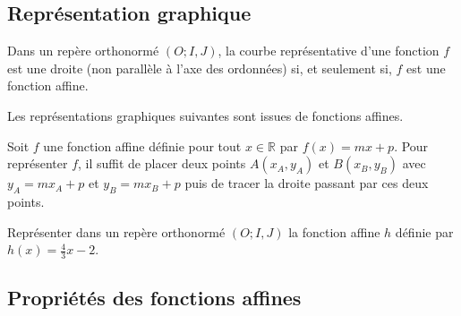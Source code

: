 \documentclass[11pt]{article}
\begin{document}
\subsection{Représentation graphique}
\begin{prop}
  Dans un repère orthonormé $(O; I, J)$, la courbe représentative d'une fonction
  $f$ est une droite (non parallèle à l'axe des ordonnées) si, et seulement si, $f$
  est une fonction affine.
\end{prop}
\begin{exemple}
  Les représentations graphiques suivantes sont issues de fonctions affines.
  \begin{center}
  \end{center}
\end{exemple}
\begin{prop}
  Soit $f$ une fonction affine définie pour tout $x\in\mathbb{R}$ par
  $f(x)=mx+p$. Pour représenter $f$, il suffit de placer deux points $A(x_A,
  y_A)$ et $B(x_B, y_B)$ avec $y_A=mx_A+p$ et $y_B=mx_B+p$ puis de tracer la
  droite passant par ces deux points.
\end{prop}

\begin{app}
  Représenter dans un repère orthonormé $(O; I, J)$ la fonction affine $h$
  définie par $h(x) = \frac{4}{3}x - 2$.
\end{app}

\subsection{Propriétés des fonctions affines}
\end{document}
